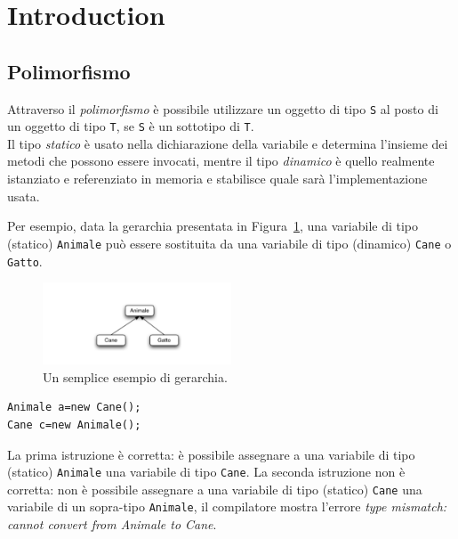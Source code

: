\documentclass{article}
\author{\textbf{\hmwkAuthorName}}
\date{} %
\begin{document}
\maketitle



\newpage
\tableofcontents
\newpage



\section{Introduction}


\subsection{Polimorfismo}
Attraverso il \emph{polimorfismo} \`e possibile utilizzare un oggetto di tipo \texttt{S} al posto di un oggetto di tipo \texttt{T}, se \texttt{S} \`e un sottotipo di \texttt{T}.\\
Il tipo  \emph{statico} \`e usato nella dichiarazione della variabile e determina l'insieme dei metodi che possono essere invocati, mentre il tipo \emph{dinamico} \`e  quello realmente istanziato e referenziato in memoria e stabilisce quale sar\`a l'implementazione usata.

Per esempio, data la gerarchia presentata in Figura~\ref{Fig:gerarchy1}, una variabile di tipo (statico) \texttt{Animale} pu\`o essere sostituita da una variabile di tipo (dinamico) \texttt{Cane} o \texttt{Gatto}.

\begin{figure}[h!]
  \centering
    \includegraphics[width=0.5\textwidth]{gerarchia.pdf}
      \caption{Un semplice esempio di gerarchia.}
      \label{Fig:gerarchy1}
\end{figure}
\begin{lstlisting}
Animale a=new Cane();
Cane c=new Animale();
\end{lstlisting}
La prima istruzione \`e corretta: \`e possibile assegnare a una variabile di tipo (statico) \texttt{Animale} una variabile di tipo \texttt{Cane}.
La seconda istruzione non \`e corretta: non \`e possibile assegnare a una variabile di tipo (statico) \texttt{Cane} una variabile di un sopra-tipo \texttt{Animale}, il compilatore mostra l'errore \emph{type mismatch: cannot convert from Animale to Cane}.
\end{document}
